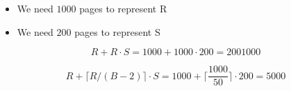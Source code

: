 \begin{exercise}{4}

\begin{itemize}
  \item We need $1000$ pages to represent R
  \item We need $200$ pages to represent S
\end{itemize}

\begin{subexercise}
  \begin{displaymath}
  R + R \cdot S = 1000 + 1000\cdot 200 = 2001000
  \end{displaymath}
\end{subexercise}

\begin{subexercise}
  \begin{displaymath}
  R + \lceil R/(B-2)\rceil \cdot S = 1000 + \lceil\frac{1000}{50}\rceil\cdot 200= 5000
  \end{displaymath}
\end{subexercise}
\end{exercise}
